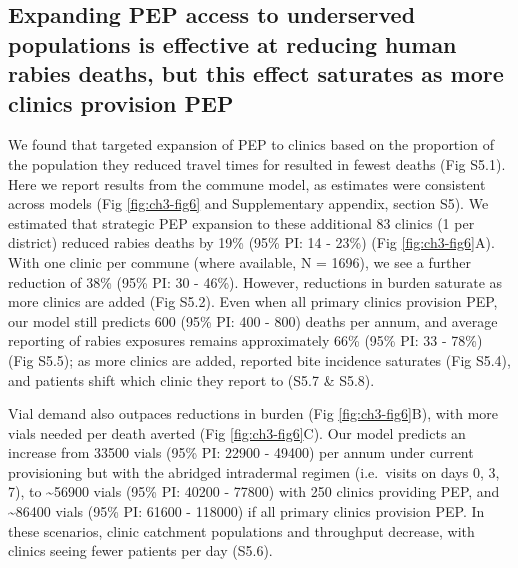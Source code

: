 \documentclass[
  oneside]{book}
\begin{document}
\hypertarget{expanding-pep-access-to-underserved-populations-is-effective-at-reducing-human-rabies-deaths-but-this-effect-saturates-as-more-clinics-provision-pep}{%
\subsection{Expanding PEP access to underserved populations is effective at reducing human rabies deaths, but this effect saturates as more clinics provision PEP}\label{expanding-pep-access-to-underserved-populations-is-effective-at-reducing-human-rabies-deaths-but-this-effect-saturates-as-more-clinics-provision-pep}}

We found that targeted expansion of PEP to clinics based on the
proportion of the population they reduced travel times for resulted in
fewest deaths (Fig S5.1). Here we report results from the commune model,
as estimates were consistent across models (Fig \ref{fig:ch3-fig6} and Supplementary
appendix, section S5). We estimated that strategic PEP expansion to
these additional 83 clinics (1 per district) reduced rabies deaths by
19\% (95\% PI: 14 - 23\%) (Fig \ref{fig:ch3-fig6}A). With one clinic per commune (where
available, N = 1696), we see a further reduction of 38\% (95\% PI: 30 -
46\%). However, reductions in burden saturate as more clinics are added
(Fig S5.2). Even when all primary clinics provision PEP, our model still
predicts 600 (95\% PI: 400 - 800) deaths per annum, and average reporting
of rabies exposures remains approximately 66\% (95\% PI: 33 - 78\%) (Fig
S5.5); as more clinics are added, reported bite incidence saturates (Fig
S5.4), and patients shift which clinic they report to (S5.7 \& S5.8).

Vial demand also outpaces reductions in burden (Fig \ref{fig:ch3-fig6}B), with more vials
needed per death averted (Fig \ref{fig:ch3-fig6}C). Our model predicts an increase from
33500 vials (95\% PI: 22900 - 49400) per annum under current provisioning
but with the abridged intradermal regimen (i.e.~visits on days 0, 3, 7),
to \textasciitilde56900 vials (95\% PI: 40200 - 77800) with 250 clinics providing PEP,
and \textasciitilde86400 vials (95\% PI: 61600 - 118000) if all primary clinics
provision PEP. In these scenarios, clinic catchment populations and
throughput decrease, with clinics seeing fewer patients per day (S5.6).
\end{document}
